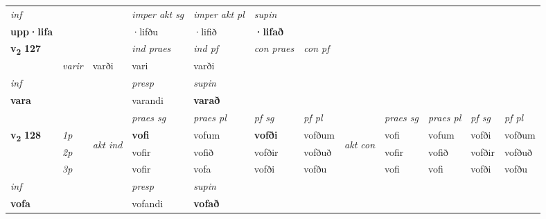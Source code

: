 \begin{longtable}[l]{X>{\footnotesize\itshape}llXXXXlXXXX}
   {\textit{inf}} & &  & \textit{imper akt sg} & \textit{imper akt pl}    & \textit{supin}   \\*
  {\textbf{upp\allowbreak ·lifa}} & && ·lifðu  & ·lifið    &  \textbf{·lifað}   \\*

\midrule

\multirow{2}{*}{{{\textbf{v{\textsubscript{2}}} \Large{\textbf{127}}}}}  &&&  \textit{ind praes} & \textit{ind pf} & \textit{con praes} & \textit{con pf} \\*
\multicolumn{3}{r}{\textit{e-n}} & varir & varði & vari & varði \\*

\cmidrule{4-7}
   {\textit{inf}} & &     & \textit{presp} & \textit{supin}   \\*
  {\textbf{vara}} & &     & varandi &  \textbf{varað}   \\*

\midrule

 & &   & \textit{praes sg}  & \textit{praes pl}    & \textit{ pf sg} & \textit{pf pl} & & \textit{praes sg}  & \textit{praes pl}    & \textit{pf sg} & \textit{pf pl }  \\ \cmidrule{4-7} \cmidrule{9-12}
 \multirow{2}{*}{{{\textbf{v{\textsubscript{2}}} \Large{\textbf{128}}}}}  & 1p & \multirow{3}{*}{\begin{turn}{90}\textit{akt ind}\end{turn}} & \textbf{vofi} & vofum & \textbf{vofði} & vofðum & \multirow{3}{*}{\begin{turn}{90}\textit{akt con}\end{turn}} &vofi & vofum & vofði & vofðum\\*
 & 2p &  &  vofir  & vofið & vofðir & vofðuð & & vofir & vofið & vofðir & vofðuð \\*
 & 3p &  & vofir & vofa & vofði & vofðu & & vofi & vofi& vofði & vofðu \\*
\cmidrule{4-7} \cmidrule{9-12}

   {\textit{inf}} & &     & \textit{presp} & \textit{supin}   \\*
  {\textbf{vofa}} & &     & vofandi &  \textbf{vofað}   \\*

\midrule


\end{longtable}
